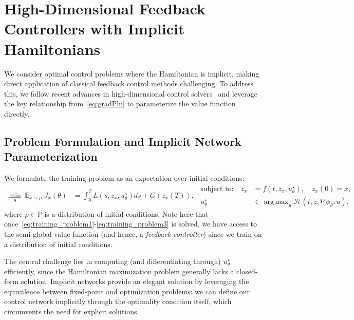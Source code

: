 \documentclass[letterpaper, 10 pt, conference]{ieeeconf}  %
\DeclareMathOperator*{\argmax}{arg\,max}
\begin{document}
    \section{High-Dimensional Feedback Controllers with Implicit Hamiltonians}
    We consider optimal control problems where the Hamiltonian is implicit, making direct application of classical feedback control methods challenging. To address this, we follow recent advances in high-dimensional control solvers~\cite{onken2022neural, onken2021neural} and leverage the key relationship from~\eqref{eq:gradPhi} to parameterize the value function directly.
    
    \subsection{Problem Formulation and Implicit Network Parameterization}
    \label{subsec: problem_formulation}
    We formulate the training problem as an expectation over initial conditions:
    \begin{subequations}
    \begin{align}
        \min_\theta \; \mathbb{E}_{x \sim \rho} \; J_x(\theta) &= \int_0^T L(s, z_{x}, u^\star_{\theta}) ds + G(z_{x}(T)), \label{eq:training_problem1}
    \end{align}
        \begin{align}
        \text{subject to:} \quad \dot{z}_x &= f(t,z_x,u_\theta^\star), \quad z_x(0) = x, \label{eq:training_problem2}
        \\
        u_\theta^\star &\in \argmax_u \mathcal{H}(t,z,\nabla \phi_\theta, u), \label{eq:training_problem3}
    \end{align}
    \end{subequations}
    where $\rho \in \mathbb{P}$ is a distribution of initial conditions.
    Note here that once~\eqref{eq:training_problem1}-\eqref{eq:training_problem3} is solved, we have access to the semi-global value function (and hence, a \emph{feedback controller}) since we train on a distribution of initial conditions. 
    
    The central challenge lies in computing (and differentiating through) $u_\theta^\star$ efficiently, since the Hamiltonian maximization problem generally lacks a closed-form solution. Implicit networks provide an elegant solution by leveraging the equivalence between fixed-point and optimization problems: we can define our control network implicitly through the optimality condition itself, which circumvents the need for explicit solutions. 
\end{document}
